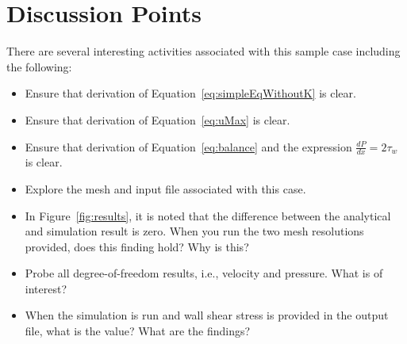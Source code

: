 \documentclass{article}
\begin{document}
\section{Discussion Points}

There are several interesting activities associated with this sample case including
the following:

\begin{itemize}
	\item Ensure that derivation of Equation~\ref{eq:simpleEqWithoutK} is clear.
	\item Ensure that derivation of Equation~\ref{eq:uMax} is clear.
	\item Ensure that derivation of Equation~\ref{eq:balance} and the expression
           $\frac{dP}{dx} = 2\tau_w$ is clear.
	\item Explore the mesh and input file associated with this case.
	\item In Figure~\ref{fig:results}, it is noted that the difference between
          the analytical and simulation result is zero. When you run the two mesh resolutions provided, 
          does this finding hold? Why is this?
        \item Probe all degree-of-freedom results, i.e., velocity and pressure. What is of interest?
        \item When the simulation is run and wall shear stress is provided in the output file,
          what is the value? What are the findings?
\end{itemize}
\end{document}

